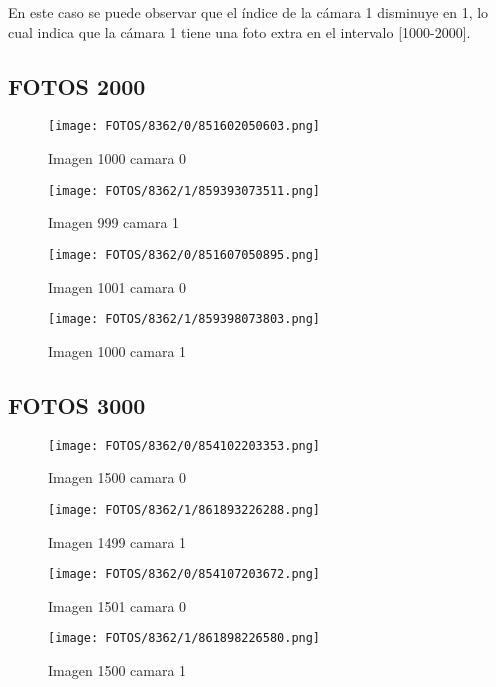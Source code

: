 \documentclass{article}
\begin{document}
\noindent En este caso se puede observar que el índice de la cámara 1 disminuye en 1, lo cual indica que la cámara 1 tiene una foto extra en el intervalo [1000-2000].

\subsection{FOTOS 2000}

\begin{figure}[H]
  \centering
  \begin{minipage}[b]{0.45\textwidth}
    \centering
    \texttt{[image: FOTOS/8362/0/851602050603.png]}
    \caption{Imagen 1000 camara 0}
  \end{minipage}
  \begin{minipage}[b]{0.45\textwidth}
    \centering
    \texttt{[image: FOTOS/8362/1/859393073511.png]}
    \caption{Imagen 999 camara 1}
  \end{minipage}
  \begin{minipage}[b]{0.45\textwidth}
    \centering
    \texttt{[image: FOTOS/8362/0/851607050895.png]}
    \caption{Imagen 1001 camara 0}
  \end{minipage}
  \begin{minipage}[b]{0.45\textwidth}
    \centering
    \texttt{[image: FOTOS/8362/1/859398073803.png]}
    \caption{Imagen 1000 camara 1}
  \end{minipage}
\end{figure}

\subsection{FOTOS 3000}

\begin{figure}[H]
  \centering
  \begin{minipage}[b]{0.45\textwidth}
    \centering
    \texttt{[image: FOTOS/8362/0/854102203353.png]}
    \caption{Imagen 1500 camara 0}
  \end{minipage}
  \begin{minipage}[b]{0.45\textwidth}
    \centering
    \texttt{[image: FOTOS/8362/1/861893226288.png]}
    \caption{Imagen 1499 camara 1}
  \end{minipage}
  \begin{minipage}[b]{0.45\textwidth}
    \centering
    \texttt{[image: FOTOS/8362/0/854107203672.png]}
    \caption{Imagen 1501 camara 0}
  \end{minipage}
  \begin{minipage}[b]{0.45\textwidth}
    \centering
    \texttt{[image: FOTOS/8362/1/861898226580.png]}
    \caption{Imagen 1500 camara 1}
  \end{minipage}
\end{figure}
\end{document}
